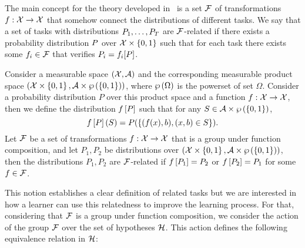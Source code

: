 The main concept for the theory developed in~\cite{Ben-DavidB08} is a set $\mathcal{F}$ of transformations $f: \mathcal{X} \to \mathcal{X}$ that somehow connect the distributions of different tasks. We say that a set of tasks with distributions $P_1, \ldots, P_T$ are $\mathcal{F}$-related if there exists a probability distribution $P$ over $\mathcal{X} \times \left\{0, 1\right\}$ such that for each task there exists some $f_i \in \mathcal{F}$ that verifies $P_i = f_i[P]$.

\begin{definition}\label{def:frel_tasks}
    Consider a measurable space $(\mathcal{X}, \mathcal{A})$ and the corresponding measurable product space $(\mathcal{X} \times \left\{0, 1\right\}, \mathcal{A} \times \wp\left( \left\{0, 1\right\} \right))$, where $\wp\left( \Omega \right)$ is the powerset of set $\Omega$. Consider a probability distribution $P$ over this product space and a function $f: \mathcal{X} \to \mathcal{X}$, then we define the distribution $f\left[ P \right]$ such that for any $S \in \mathcal{A} \times \wp\left( \left\{0, 1\right\} \right)$,
    $$ f\left[ P \right](S) = P(\left\{(f(x), b), (x, b) \in S \right\}).$$
    Let $\mathcal{F}$ be a set of transformations $f: \mathcal{X} \to \mathcal{X}$ that is a group under function composition, and let $P_1, P_2$ be distributions over $(\mathcal{X} \times \left\{0, 1\right\}, \mathcal{A} \times \wp\left( \left\{0, 1\right\} \right))$, then the distributions $P_1, P_2$ are $\mathcal{F}$-related if $f\left[ P_1 \right]= P_2$ or $f\left[ P_2 \right] = P_1$ for some $f \in \mathcal{F}$.
\end{definition}
This notion establishes a clear definition of related tasks but we are interested in how a learner can use this relatedness to improve the learning process.
For that, considering that $\mathcal{F}$ is a group under function composition, we consider the action of the group $\mathcal{F}$ over the set of hypotheses $\mathcal{H}$. This action defines the following equivalence relation in $\mathcal{H}$:
